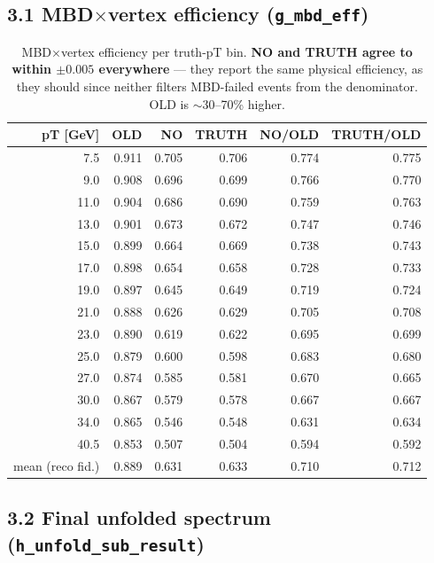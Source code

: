 \documentclass[11pt,a4paper]{article}
\begin{document}
\subsection*{3.1 MBD$\times$vertex efficiency (\texttt{g\_mbd\_eff})}

\begin{table}[H]
\centering\small
\begin{tabular}{rrrrrr}
\toprule
pT [GeV] & OLD & NO & TRUTH & NO/OLD & TRUTH/OLD\\
\midrule
 7.5 & 0.911 & 0.705 & 0.706 & 0.774 & 0.775\\
 9.0 & 0.908 & 0.696 & 0.699 & 0.766 & 0.770\\
11.0 & 0.904 & 0.686 & 0.690 & 0.759 & 0.763\\
13.0 & 0.901 & 0.673 & 0.672 & 0.747 & 0.746\\
15.0 & 0.899 & 0.664 & 0.669 & 0.738 & 0.743\\
17.0 & 0.898 & 0.654 & 0.658 & 0.728 & 0.733\\
19.0 & 0.897 & 0.645 & 0.649 & 0.719 & 0.724\\
21.0 & 0.888 & 0.626 & 0.629 & 0.705 & 0.708\\
23.0 & 0.890 & 0.619 & 0.622 & 0.695 & 0.699\\
25.0 & 0.879 & 0.600 & 0.598 & 0.683 & 0.680\\
27.0 & 0.874 & 0.585 & 0.581 & 0.670 & 0.665\\
30.0 & 0.867 & 0.579 & 0.578 & 0.667 & 0.667\\
34.0 & 0.865 & 0.546 & 0.548 & 0.631 & 0.634\\
40.5 & 0.853 & 0.507 & 0.504 & 0.594 & 0.592\\
\midrule
mean (reco fid.) & 0.889 & 0.631 & 0.633 & 0.710 & 0.712\\
\bottomrule
\end{tabular}
\caption{MBD$\times$vertex efficiency per truth-pT bin. \textbf{NO and TRUTH agree to within $\pm 0.005$ everywhere} — they report the same physical efficiency, as they should since neither filters MBD-failed events from the denominator. OLD is $\sim$30--70\% higher.}
\label{tab:mbdeff}
\end{table}

\subsection*{3.2 Final unfolded spectrum (\texttt{h\_unfold\_sub\_result})}
\end{document}
